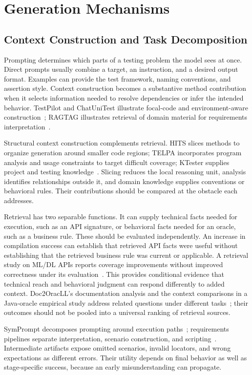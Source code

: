 \section{Generation Mechanisms}
\label{sec:generation}
\subsection{Context Construction and Task Decomposition}
Prompting determines which parts of a testing problem the model sees at once. Direct prompts usually combine a target, an instruction, and a desired output format. Examples can provide the test framework, naming conventions, and assertion style. Context construction becomes a substantive method contribution when it selects information needed to resolve dependencies or infer the intended behavior. TestPilot and ChatUniTest illustrate focal-code and environment-aware construction~\cite{U01,U02}; RAGTAG illustrates retrieval of domain material for requirements interpretation~\cite{R01}.

Structural context construction complements retrieval. HITS slices methods to organize generation around smaller code regions; TELPA incorporates program analysis and usage constraints to target difficult coverage; KTester supplies project and testing knowledge~\cite{U13,U14,U15}. Slicing reduces the local reasoning unit, analysis identifies relationships outside it, and domain knowledge supplies conventions or behavioral rules. Their contributions should be compared at the obstacle each addresses.

Retrieval has two separable functions. It can supply technical facts needed for execution, such as an API signature, or behavioral facts needed for an oracle, such as a business rule. These should be evaluated independently. An increase in compilation success can establish that retrieved API facts were useful without establishing that the retrieved business rule was current or applicable. A retrieval study on ML/DL APIs reports coverage improvements without improved correctness under its evaluation~\cite{U17}. This provides conditional evidence that technical reach and behavioral judgment can respond differently to added context. Doc2OracLL's documentation analysis and the context comparisons in a Java-oracle empirical study address related questions under different tasks~\cite{O08,E07}; their outcomes should not be pooled into a universal ranking of retrieval sources.

SymPrompt decomposes prompting around execution paths~\cite{U03}; requirements pipelines separate interpretation, scenario construction, and scripting~\cite{R02,R03}. Intermediate artifacts expose omitted scenarios, invalid locators, and wrong expectations as different errors. Their utility depends on final behavior as well as stage-specific success, because an early misunderstanding can propagate.

